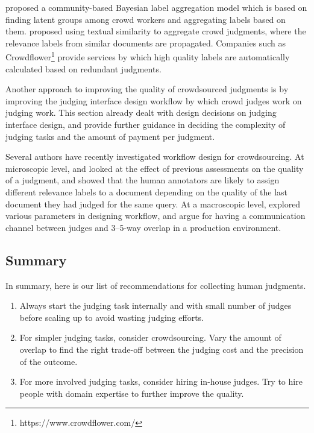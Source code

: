 \cite{Venanzi:2014} proposed a community-based Bayesian label aggregation model which is based on finding latent groups among crowd workers and aggregating labels based on them. \cite{Davtyan2015} proposed using textual similarity to aggregate crowd judgments, where the relevance labels from similar documents are propagated. Companies such as Crowdflower\footnote{https://www.crowdflower.com/} provide services by which high quality labels are automatically calculated based on redundant judgments.

Another approach to improving the quality of crowdsourced judgments is by improving the judging interface design workflow by which crowd judges work on judging work. This section already dealt with design decisions on judging interface design, and \cite{Kazai2012} provide further guidance in deciding the complexity of judging tasks and the amount of payment per judgment.

Several authors have recently investigated workflow design for crowdsourcing. At microscopic level, \cite{Scholer:2013} and \cite{Shokouhi:2015} looked at the effect of previous assessments on the quality of a judgment, and showed that the human annotators are likely to assign different relevance labels to a document depending on the quality of the last document they had judged for the same query. At a macroscopic level, \cite{Megorskaya2015} explored various parameters in designing workflow, and argue for having a communication channel between judges and 3--5-way overlap in a production environment.



\subsection{Summary}
In summary, here is our list of recommendations for collecting human judgments.

\begin{enumerate}
	\item Always start the judging task internally and with small number of judges before scaling up to avoid wasting judging efforts.
	\item For simpler judging tasks, consider crowdsourcing. Vary the amount of overlap to find the right trade-off between the judging cost and the precision of the outcome.
	\item For more involved judging tasks, consider hiring in-house judges. Try to hire people with domain expertise to further improve the quality.
\end{enumerate}

